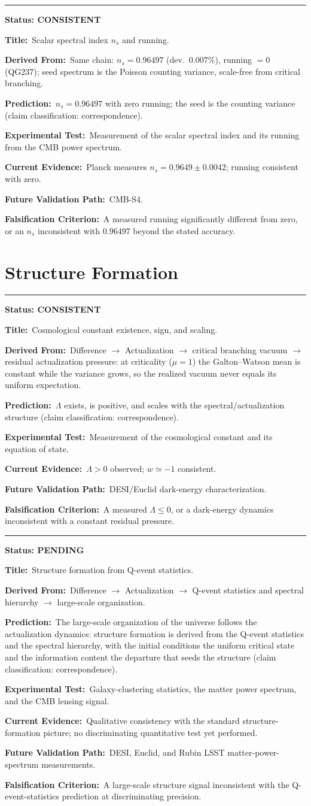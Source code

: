 \documentclass[11pt,a4paper]{article}
\newcommand{\predstart}[2]{%
  \par\medskip\noindent\hrule\par\smallskip
  \noindent{\large\bfseries #1}\hfill{\bfseries Status: #2}\par\smallskip
}
\newcommand{\pfield}[2]{%
  \noindent\textbf{#1:}~#2\par\smallskip
}
\begin{document}
\predstart{AT-P029}{CONSISTENT}
\pfield{Title}{Scalar spectral index $n_s$ and running.}
\pfield{Derived From}{Same chain: $n_s = 0.96497$ (dev.\ $0.007\%$), running $= 0$
(QG237); seed spectrum is the Poisson counting variance, scale-free from critical
branching.}
\pfield{Prediction}{$n_s = 0.96497$ with zero running; the seed is the counting variance
(claim classification: correspondence).}
\pfield{Experimental Test}{Measurement of the scalar spectral index and its running from the
CMB power spectrum.}
\pfield{Current Evidence}{Planck measures $n_s = 0.9649 \pm 0.0042$; running consistent with
zero.}
\pfield{Future Validation Path}{CMB-S4.}
\pfield{Falsification Criterion}{A measured running significantly different from zero, or an
$n_s$ inconsistent with $0.96497$ beyond the stated accuracy.}

\section{Structure Formation}
\label{sec:structure}

\predstart{AT-P030}{CONSISTENT}
\pfield{Title}{Cosmological constant existence, sign, and scaling.}
\pfield{Derived From}{Difference $\to$ Actualization $\to$ critical branching vacuum $\to$
residual actualization pressure: at criticality ($\mu=1$) the Galton--Watson mean is
constant while the variance grows, so the realized vacuum never equals its uniform
expectation.}
\pfield{Prediction}{$\Lambda$ exists, is positive, and scales with the spectral/actualization
structure (claim classification: correspondence).}
\pfield{Experimental Test}{Measurement of the cosmological constant and its equation of
state.}
\pfield{Current Evidence}{$\Lambda > 0$ observed; $w \simeq -1$ consistent.}
\pfield{Future Validation Path}{DESI/Euclid dark-energy characterization.}
\pfield{Falsification Criterion}{A measured $\Lambda \le 0$, or a dark-energy dynamics
inconsistent with a constant residual pressure.}

\predstart{AT-P031}{PENDING}
\pfield{Title}{Structure formation from Q-event statistics.}
\pfield{Derived From}{Difference $\to$ Actualization $\to$ Q-event statistics and spectral
hierarchy $\to$ large-scale organization.}
\pfield{Prediction}{The large-scale organization of the universe follows the actualization
dynamics: structure formation is derived from the Q-event statistics and the spectral
hierarchy, with the initial conditions the uniform critical state and the information
content the departure that seeds the structure (claim classification: correspondence).}
\pfield{Experimental Test}{Galaxy-clustering statistics, the matter power spectrum, and the
CMB lensing signal.}
\pfield{Current Evidence}{Qualitative consistency with the standard structure-formation
picture; no discriminating quantitative test yet performed.}
\pfield{Future Validation Path}{DESI, Euclid, and Rubin LSST matter-power-spectrum
measurements.}
\pfield{Falsification Criterion}{A large-scale structure signal inconsistent with the
Q-event-statistics prediction at discriminating precision.}
\end{document}
